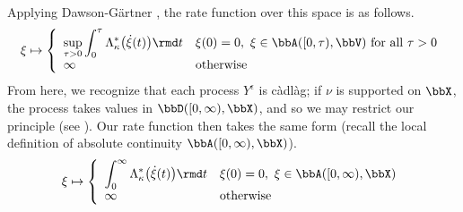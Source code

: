 Applying Dawson-G\"artner \cite[Theorem 4.6.1]{dembo2010}, the rate function over this space is as follows.
\[
  \pathVar \mapsto \left\{ \begin{array}{ll}
    \displaystyle\sup_{\tau>0} \int_0^\tau \ode_\affDist^*\big(\dot\pathVar(t)\big) \rmd t & \pathVar(0) = 0, ~ \pathVar \in \acpathSpace{[0,\tau)}{\vecSpace} \text{ for all } \tau > 0 \\
    \infty & \text{otherwise}
  \end{array}\right.
\]
From here, we recognize that each process $Y^\epsilon$ is c\`adl\`ag; if $\nu$ is supported on $\stateSpace$, the process takes values in $\pathSpace{[0,\infty)}{\stateSpace}$, and so we may restrict our principle (see \cite[Lemma 4.1.5(b)]{dembo2010}).
Our rate function then takes the same form (recall the local definition of absolute continuity $\acpathSpace{[0,\infty)}{\stateSpace}$).
\begin{equation}
  \label{eq:rf-mogulskii}
  \pathVar \mapsto \left\{\begin{array}{ll}
    \displaystyle\int_0^\infty \ode_\affDist^*\big(\dot\pathVar(t)\big) \rmd t & \pathVar(0) = 0, ~\pathVar \in \acpathSpace{[0,\infty)}{\stateSpace} \\
    \infty & \text{otherwise}
  \end{array}\right.
\end{equation}




